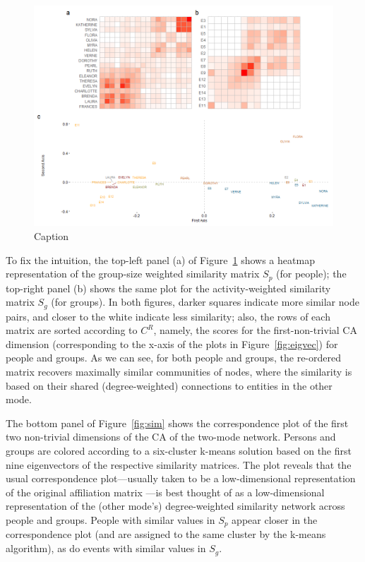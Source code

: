 \documentclass[a4paper,fleqn]{cas-sc}
\begin{document}
\begin{figure}
    \centering
    \includegraphics[width=1.0\textwidth]{Plots/sim.png}
    \caption{Caption}
    \label{fig:ca-sim}
\end{figure}

To fix the intuition, the top-left panel (a) of Figure~\ref{fig:ca-sim} shows a heatmap representation of the group-size weighted similarity matrix $S_p$ (for people); the top-right panel (b) shows the same plot for the activity-weighted similarity matrix $S_g$ (for groups). In both figures, darker squares indicate more similar node pairs, and closer to the white indicate less similarity; also, the rows of each matrix are sorted according to $C^R$, namely, the scores for the first-non-trivial CA dimension (corresponding to the x-axis of the plots in Figure~\ref{fig:eigvec}) for people and groups. As we can see, for both people and groups, the re-ordered matrix recovers maximally similar communities of nodes, where the similarity is based on their shared (degree-weighted) connections to entities in the other mode. 

The bottom panel of Figure~\ref{fig:sim} shows the correspondence plot of the first two non-trivial dimensions of the CA of the two-mode network. Persons and groups are colored according to a six-cluster k-means solution based on the first nine eigenvectors of the respective similarity matrices. The plot reveals that the usual correspondence plot---usually taken to be a low-dimensional representation of the original affiliation matrix \citep{borgatti1997network}---is best thought of as a low-dimensional representation of the (other mode's) degree-weighted similarity network across people and groups. People with similar values in $S_p$ appear closer in the correspondence plot (and are assigned to the same cluster by the k-means algorithm), as do events with similar values in $S_g$.
\end{document}
